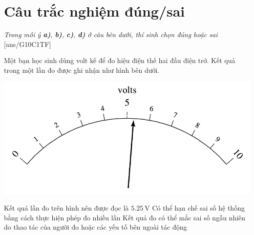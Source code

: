 \section{Câu trắc nghiệm đúng/sai} 
\textit{Trong mỗi ý \textbf{a)}, \textbf{b)}, \textbf{c)}, \textbf{d)} ở câu bên dưới, thí sinh chọn đúng hoặc sai}
\setcounter{ex}{0}
[ans/G10C1TF]
\begin{ex}
	Một bạn học sinh dùng volt kế để đo hiệu điện thế hai đầu điện trở. Kết quả trong một lần đo được ghi nhận như hình bên dưới.
	\begin{center}
		\includegraphics[width=0.6\linewidth]{figs/G10-CHUONG1-2}
	\end{center}
	{Kết quả lần đo trên hình nên được đọc là $\SI{5.25}{\volt}$}
	{Có thể hạn chế sai số hệ thống bằng cách thực hiện phép đo nhiều lần}
	{\True Kết quả đo có thể mắc sai số ngẫu nhiên do thao tác của người đo hoặc các yếu tố bên ngoài tác động}
\end{ex}

